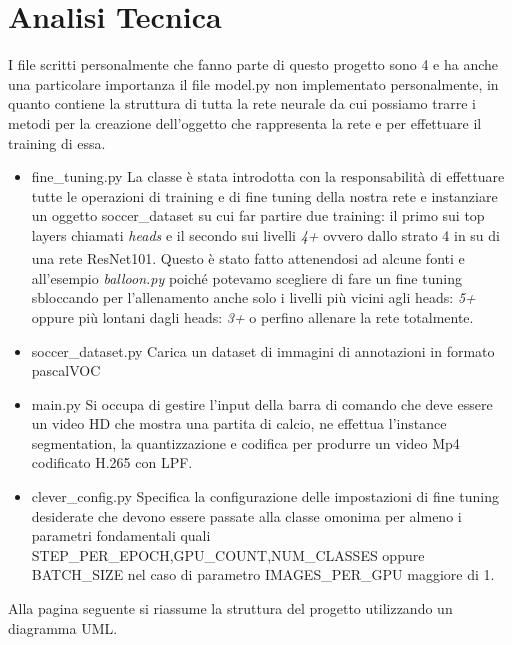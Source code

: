 \section{Analisi Tecnica}
\label{sec:tech}
I file scritti personalmente che fanno parte di questo progetto sono 4 e ha anche una particolare importanza il file model.py non implementato personalmente, in quanto contiene la struttura di tutta la rete neurale da cui possiamo trarre i metodi per la creazione dell'oggetto che rappresenta la rete e per effettuare il training di essa.
\begin{itemize}
\item fine\_tuning.py
La classe è stata introdotta con la responsabilità di effettuare tutte le operazioni di training e di fine tuning della nostra rete e instanziare un oggetto soccer\_dataset su cui far partire due training: il primo sui top layers chiamati \emph{heads} e il secondo sui livelli \emph{4+} ovvero dallo strato 4 in su di una rete ResNet101. Questo è stato fatto attenendosi ad alcune fonti \textsuperscript{\cite{fine_tuning_book}}  e all'esempio \emph{balloon.py} poiché potevamo scegliere di fare un fine tuning sbloccando per l'allenamento anche solo i livelli più vicini agli heads: \emph{5+} oppure più lontani dagli heads: \emph{3+} o perfino allenare la rete totalmente.
\item soccer\_dataset.py
Carica un dataset di immagini di annotazioni in formato pascalVOC
\item main.py
Si occupa di gestire l'input della barra di comando che deve essere un video HD che mostra una partita di calcio, ne effettua l'instance segmentation, la quantizzazione e codifica per produrre un video Mp4 codificato H.265 con LPF.
\item clever\_config.py
Specifica la configurazione delle impostazioni di fine tuning desiderate che devono essere passate alla classe omonima per almeno i parametri fondamentali quali STEP\_PER\_EPOCH,GPU\_COUNT,NUM\_CLASSES oppure BATCH\_SIZE nel caso di parametro IMAGES\_PER\_GPU maggiore di 1.
\end{itemize}
Alla pagina seguente si riassume la struttura del progetto utilizzando un diagramma UML.

